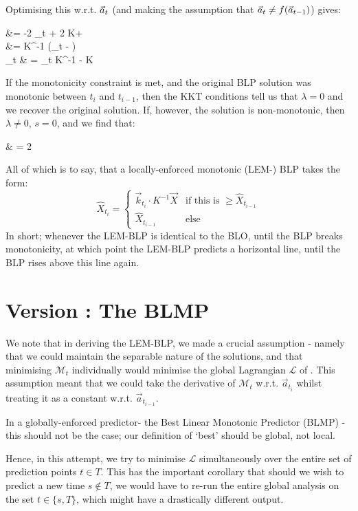 \documentclass{article}
\newcounter{version}
\newcommand\attempt[1]{\stepcounter{version} \section*{Version \theversion: #1}}
\begin{document}
		Optimising this w.r.t. $\vec{a}_t$ (and making the assumption that $\vec{a}_t \neq f(\vec{a}_{t-1})$) gives:
		\begin{spalign}
			 &= -2 _t + 2 K\a + \lambda {} 
			\\
			\a &= K^{-1} \left(_t -   \right)
			\\
			_t & = _t \cdot K^{-1}  -  \vec{X} \cdot K  
		\end{spalign}
		If the monotonicity constraint is met, and the original BLP solution was monotonic between $t_i$ and $t_{i-1}$, then the KKT conditions tell us that $\lambda = 0$ and we recover the original solution. If, however, the solution is non-monotonic, then $\lambda \neq 0$, $s = 0$, and we find that:
		\begin{spalign}
			\lambda & = 2\frac{\vec{k}_t \cdot K^{-1}  - \hat{X}_{t_{i-1}}}{\vec{X} \cdot K \vec{X} }
		\end{spalign}
		All of which is to say, that a locally-enforced monotonic (LEM-) BLP takes the form:
		\begin{equation}
			\hat{X}_{t_i} = \begin{cases} \vec{k}_{t_i} \cdot K^{-1} \vec{X} & \text{if this is } \geq \hat{X}_{t_{i-1}}
				\\
				\hat{X}_{t_{i-1}} & \text{else}
			\end{cases}
		\end{equation}
		In short; whenever the LEM-BLP is identical to the BLO, until the BLP breaks monotonicity, at which point the LEM-BLP predicts a horizontal line, until the BLP rises above this line again.


	\attempt{The BLMP}

		We note that in deriving the LEM-BLP, we made a crucial assumption - namely that we could maintain the separable nature of the solutions, and that minimising $\mathcal{M}_t$ individually would minimise the global Lagrangian $\mathcal{L}$ of . This assumption meant that we could take the derivative of $\mathcal{M}_t$ w.r.t. $\vec{a}_{t_i}$ whilst treating it as a constant w.r.t. $\vec{a}_{t_{i-1}}$.

		In a globally-enforced predictor- the Best Linear Monotonic Predictor (BLMP) - this should not be the case; our definition of `best' should be global, not local. 

		Hence, in this attempt, we try to minimise $\mathcal{L}$ simultaneously over the entire set of prediction points $t\in T$. This has the important corollary that should we wish to predict a new time $s \notin T$, we would have to re-run the entire global analysis on the set $t \in \{s, T\}$, which might have a drastically different output. 
\end{document}
